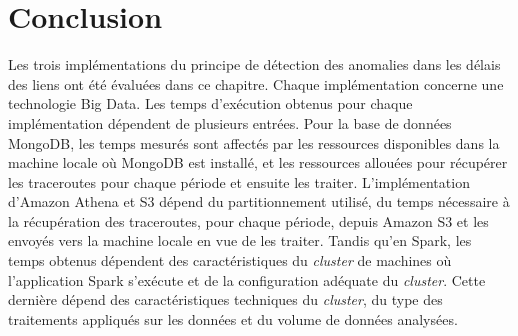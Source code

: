 










\section{Conclusion}

Les trois implémentations du principe de détection des anomalies dans les délais des liens ont été évaluées dans ce chapitre. Chaque implémentation  concerne une technologie Big Data. Les temps d'exécution obtenus pour chaque implémentation dépendent de plusieurs entrées. Pour la base de données  MongoDB, les temps  mesurés sont affectés par les ressources disponibles dans la machine locale où MongoDB est installé, et les ressources allouées pour récupérer les traceroutes pour chaque période et ensuite les traiter. L'implémentation d'Amazon Athena et S3 dépend du partitionnement utilisé, du temps nécessaire à la récupération des traceroutes, pour chaque période,  depuis Amazon S3 et les envoyés vers la machine locale en vue de les traiter. Tandis qu'en Spark, les temps obtenus dépendent des caractéristiques du \textit{cluster} de machines où l'application Spark s'exécute et de la configuration adéquate du \textit{cluster}. Cette dernière dépend des caractéristiques techniques du \textit{cluster}, du type des traitements appliqués sur les données et du volume de données   analysées.

